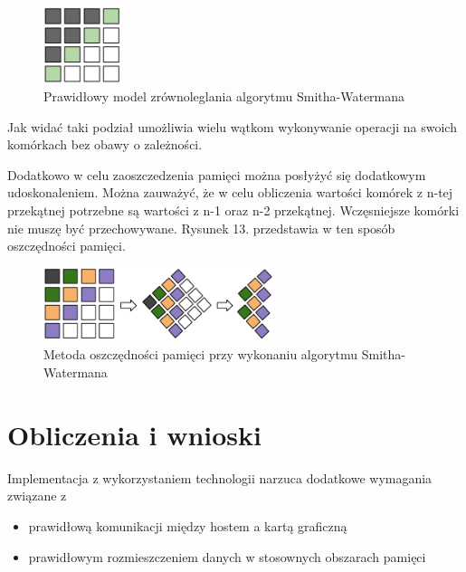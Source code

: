 \documentclass[a4paper,12pt]{article}
\newenvironment{lista}{
\begin{itemize}
  \setlength{\itemsep}{1pt}
  \setlength{\parskip}{0pt}
  \setlength{\parsep}{0pt}
}{\end{itemize}}
\begin{document}
\begin{figure}[H]
  \vspace{5pt}
  \centering
  \begin{center}
  \includegraphics[width=0.2\textwidth]{images/DobryModelZrownoleglenia.png}
  \end{center}
  \caption{Prawidłowy model zrównoleglania algorytmu Smitha-Watermana}
 \end{figure}

Jak widać taki podział umożliwia wielu wątkom wykonywanie operacji na swoich komórkach bez obawy o zależności. 

Dodatkowo w celu zaoszczedzenia pamięci można posłyżyć się dodatkowym udoskonaleniem. Można zauważyć, że w celu obliczenia wartości komórek z n-tej przekątnej potrzebne są wartości z n-1 oraz n-2 przekątnej. Wczęsniejsze komórki nie muszę być przechowywane. Rysunek 13. przedstawia w ten sposób oszczędności pamięci.

\begin{figure}[H]
  \vspace{5pt}
  \centering
  \begin{center}
  \includegraphics[width=0.6\textwidth]{images/OszczednoscPamieciPrzyZrownolegleniu.png}
  \end{center}
  \caption{Metoda oszczędności pamięci przy wykonaniu algorytmu Smitha-Watermana}
 \end{figure}


\section*{Obliczenia i wnioski}
Implementacja z wykorzystaniem technologii narzuca dodatkowe wymagania związane z
\begin{lista}
\item prawidłową komunikacji między hostem a kartą graficzną
\item prawidłowym rozmieszczeniem danych w stosownych obszarach pamięci
\end{lista} 
\end{document}
